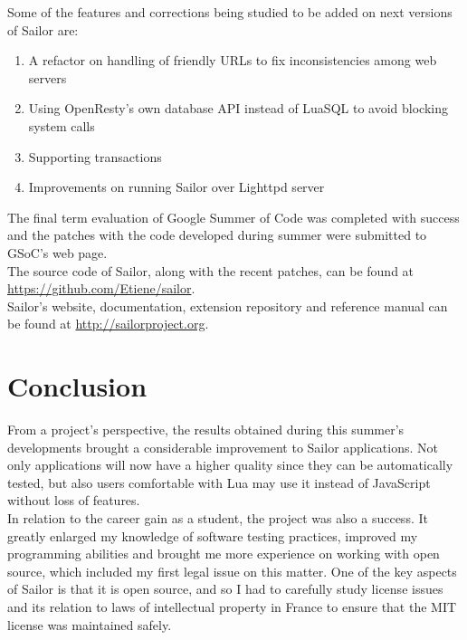 \documentclass{article}
\begin{document}
Some of the features and corrections being studied to be added on next versions of Sailor are:\\

\begin{enumerate}\item A refactor on handling of friendly URLs to fix inconsistencies among web servers
\item Using OpenResty's own database API instead of LuaSQL to avoid blocking system calls
\item Supporting transactions
\item Improvements on running Sailor over Lighttpd server
\end{enumerate}

The final term evaluation of Google Summer of Code was completed with success and the patches with the code developed during summer were submitted to GSoC's web page.\\

The source code of Sailor, along with the recent patches, can be found at \url{https://github.com/Etiene/sailor}.\\

Sailor's website, documentation, extension repository and reference manual can be found at \url{http://sailorproject.org}.

\newpage

\section{Conclusion}

From a project's perspective, the results obtained during this summer's developments brought a considerable improvement to Sailor applications. Not only applications will now have a higher quality since they can be automatically tested, but also users comfortable with Lua may use it instead of JavaScript without loss of features.\\

In relation to the career gain as a student, the project was also a success. It greatly enlarged my knowledge of software testing practices, improved my programming abilities and brought me more experience on working with open source, which included my first legal issue on this matter. One of the key aspects of Sailor is that it is open source, and so I had to carefully study license issues and its relation to laws of intellectual property in France to ensure that the MIT license was maintained safely. \\
\end{document}
